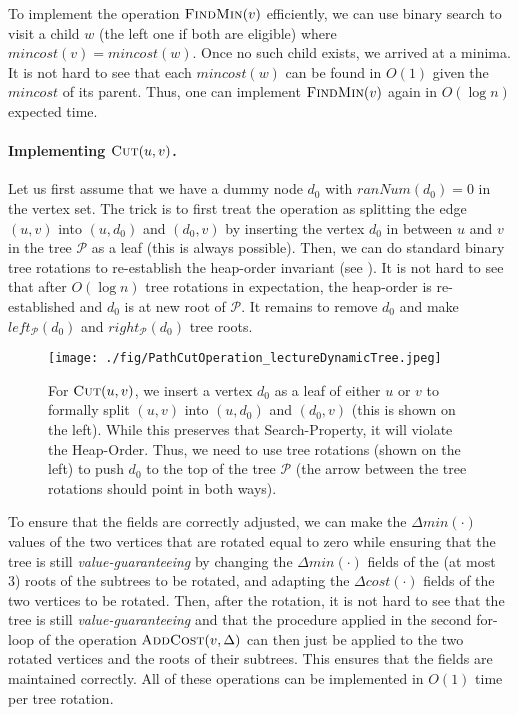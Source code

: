 To implement the operation $\textsc{FindMin}(v)$ efficiently, we can use binary search to visit a child $w$ (the left one if both are eligible) where $mincost(v) = mincost(w)$. Once no such child exists, we arrived at a minima. It is not hard to see that each $mincost(w)$ can be found in $O(1)$ given the $mincost$ of its parent. Thus, one can implement $\textsc{FindMin}(v)$ again in $O(\log n)$ expected time.

\paragraph{Implementing $\textsc{Cut}(u,v)$.} Let us first assume that we have a dummy node $d_0$ with $ranNum(d_0) = 0$ in the vertex set. The trick is to first treat the operation as splitting the edge $(u,v)$ into $(u,d_0)$ and $(d_0,v)$ by inserting the vertex $d_0$ in between $u$ and $v$ in the tree $\mathcal{P}$ as a leaf (this is always possible). Then, we can do standard binary tree rotations to re-establish the heap-order invariant (see ). It is not hard to see that after $O(\log n)$ tree rotations in expectation, the heap-order is re-established and $d_0$ is at new root of $\mathcal{P}$. It remains to remove $d_0$ and make $left_{\mathcal{P}}(d_0)$ and $right_{\mathcal{P}}(d_0)$ tree roots.

\begin{figure}[!ht]
    \centering
    \texttt{[image: ./fig/PathCutOperation\_lectureDynamicTree.jpeg]}
    \caption{For $\textsc{Cut}(u,v)$, we insert a vertex $d_0$ as a leaf of either $u$ or $v$ to formally split $(u,v)$ into $(u,d_0)$ and $(d_0,v)$ (this is shown on the left). While this preserves that Search-Property, it will violate the Heap-Order. Thus, we need to use tree rotations (shown on the left) to push $d_0$ to the top of the tree $\mathcal{P}$ (the arrow between the tree rotations should point in both ways).}
    \label{fig:binaryTreeRotation}
\end{figure}

To ensure that the fields are correctly adjusted, we can make the $\Delta min(\cdot)$ values of the two vertices that are rotated equal to zero while ensuring that the tree is still \emph{value-guaranteeing} by changing the $\Delta min(\cdot)$ fields of the (at most 3) roots of the subtrees to be rotated, and adapting the $\Delta cost(\cdot)$ fields of the two vertices to be rotated. Then, after the rotation, it is not hard to see that the tree is still \emph{value-guaranteeing} and that the procedure applied in the second for-loop of the operation $\textsc{AddCost}(v, \Delta)$ can then just be applied to the two rotated vertices and the roots of their subtrees. This ensures that the fields are maintained correctly. All of these operations can be implemented in $O(1)$ time per tree rotation.

